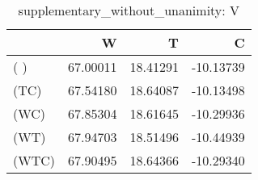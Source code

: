 \begin{table}
\centering
\caption{supplementary_without_unanimity: V}
\begin{tabular}{lrrr}
\toprule
{} &        W &        T &         C \\
\midrule
( )   & 67.00011 & 18.41291 & -10.13739 \\
(TC)  & 67.54180 & 18.64087 & -10.13498 \\
(WC)  & 67.85304 & 18.61645 & -10.29936 \\
(WT)  & 67.94703 & 18.51496 & -10.44939 \\
(WTC) & 67.90495 & 18.64366 & -10.29340 \\
\bottomrule
\end{tabular}
\end{table}
